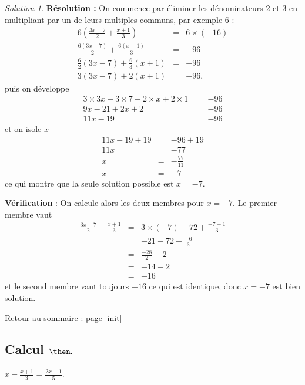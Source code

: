 \documentclass[14pt]{article}
\theoremstyle{remark}
\newtheorem*{sol}{Solution}
\newcounter{n}
\renewcommand{\it}{Retour au sommaire : page \ref{init}
	\subsection{Calcul $ \mathbf{ \then}.$}\label{\then} \stepcounter{n} }
\theoremstyle{plain}
\begin{document}
\begin{sol}
\textbf{Résolution :} On commence par éliminer les dénominateurs $2$ et $3$ en multipliant par un de leurs multiples communs, par exemple $6$ : 
\begin{eqnarray*}
6\left(\frac{3x-7}2 + \frac{x+1}3\right)&=& 6\times (-16)\\
\frac{6(3x-7)}2 + \frac{6(x+1)}3 &=& -96\\
\frac62(3x-7) + \frac63(x+1) &=& -96\\
3(3x-7) + 2(x+1)&=& -96,
\end{eqnarray*} puis on développe
\begin{eqnarray*} 
3\times 3x-3\times 7 + 2\times x+2\times 1&=& -96\\
9x - 21 + 2x + 2 &=& -96 \\
11x -19 &=& -96
\end{eqnarray*}et on isole $x$
\begin{eqnarray*}11x-19+19 &=& -96+19 \\
11x &=& -77\\
x&=& -\frac{77}{11}\\
x&=& -7
\end{eqnarray*}
ce qui montre que la seule solution possible est $x=-7$. 

\textbf{Vérification} : On calcule alors les deux membres pour $x=-7$. Le premier membre vaut 
\begin{eqnarray*}\frac{3x-7}2 + \frac{x+1}3 
&=& {3\times (-7) - 7}2 + \frac{-7+1}3 \\
&=& {-21-7}2 +\frac{-6}3 \\
&=& \frac{-28}2 -2 \\
&=& -14-2\\
&=&-16
\end{eqnarray*}
et le second membre vaut toujours $-16$ ce qui est identique, donc $x=-7$ est bien solution.
\end{sol}
\it $x-\frac{x+1}3 = \frac{2x+1}5$. 
\end{document}
